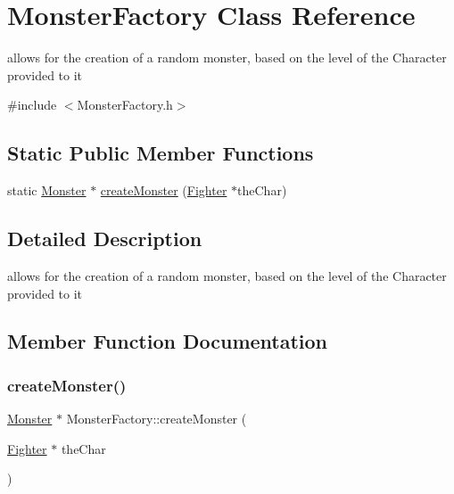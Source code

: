 \hypertarget{class_monster_factory}{}\section{Monster\+Factory Class Reference}
\label{class_monster_factory}


allows for the creation of a random monster, based on the level of the Character provided to it  




{\ttfamily \#include $<$Monster\+Factory.\+h$>$}

\subsection*{Static Public Member Functions}
\begin{DoxyCompactItemize}
\item 
static \hyperlink{class_monster}{Monster} $\ast$ \hyperlink{class_monster_factory_a7d532f0754e191b1f281c18e0c8fe8bf}{create\+Monster} (\hyperlink{class_fighter}{Fighter} $\ast$the\+Char)
\end{DoxyCompactItemize}


\subsection{Detailed Description}
allows for the creation of a random monster, based on the level of the Character provided to it 

\subsection{Member Function Documentation}
\hypertarget{class_monster_factory_a7d532f0754e191b1f281c18e0c8fe8bf}{}\label{class_monster_factory_a7d532f0754e191b1f281c18e0c8fe8bf} 
\subsubsection{\texorpdfstring{create\+Monster()}{createMonster()}}
{\footnotesize\ttfamily \hyperlink{class_monster}{Monster} $\ast$ Monster\+Factory\+::create\+Monster (\begin{DoxyParamCaption}\item[{\hyperlink{class_fighter}{Fighter} $\ast$}]{the\+Char }\end{DoxyParamCaption})\hspace{0.3cm}{\ttfamily [static]}}


